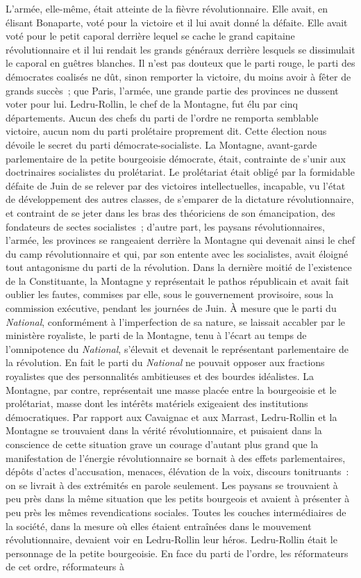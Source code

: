 \documentclass[twoside]{book} %
\begin{document}
L’armée, elle-même, était atteinte de la fièvre révolutionnaire. Elle avait, en élisant Bonaparte, voté pour la victoire et il lui avait donné la défaite. Elle avait voté pour le petit caporal derrière lequel se cache le grand capitaine révolutionnaire et il lui rendait les grands généraux derrière lesquels se dissimulait le caporal en guêtres blanches. Il n’est pas douteux que le parti rouge, le parti des démocrates coalisés ne dût, sinon remporter la victoire, du moins avoir à fêter de grands succès ; que Paris, l’armée, une grande partie des provinces ne dussent voter pour lui. Ledru-Rollin, le chef de la Montagne, fut élu par cinq départements. Aucun des chefs du parti de l’ordre ne remporta semblable victoire, aucun nom du parti prolétaire proprement dit. Cette élection nous dévoile le secret du parti démocrate-socialiste. La Montagne, avant-garde parlementaire de la petite bourgeoisie démocrate, était, contrainte de s’unir aux doctrinaires socialistes du prolétariat. Le prolétariat était obligé par la formidable défaite de Juin de se relever par des victoires intellectuelles, incapable, vu l’état de développement des autres classes, de s’emparer de la dictature révolutionnaire, et contraint de se jeter dans les bras des théoriciens de son émancipation, des fondateurs de sectes socialistes ; d’autre part, les paysans révolutionnaires, l’armée, les provinces se rangeaient derrière la Montagne qui devenait ainsi le chef du camp révolutionnaire et qui, par son entente avec les socialistes, avait éloigné tout antagonisme du parti de la révolution. Dans la dernière moitié de l’existence de la Constituante, la Montagne y représentait le pathos républicain et avait fait oublier les fautes, commises par elle, sous le gouvernement provisoire, sous la commission exécutive, pendant les journées de Juin. À mesure que le parti du \emph{National}, conformément à l’imperfection de sa nature, se laissait accabler par le ministère royaliste, le parti de la Montagne, tenu à l’écart au temps de l’omnipotence du \emph{National}, s’élevait et devenait le représentant parlementaire de la révolution. En fait le parti du \emph{National} ne pouvait opposer aux fractions royalistes que des personnalités ambitieuses et des bourdes idéalistes. La Montagne, par contre, représentait une masse placée entre la bourgeoisie et le prolétariat, masse dont les intérêts matériels exigeaient des institutions démocratiques. Par rapport aux Cavaignac et aux Marrast, Ledru-Rollin et la Montagne se trouvaient dans la vérité révolutionnaire, et puisaient dans la conscience de cette situation grave un courage d’autant plus grand que la manifestation de l’énergie révolutionnaire se bornait à des effets parlementaires, dépôts d’actes d’accusation, menaces, élévation de la voix, discours tonitruants : on se livrait à des extrémités en parole seulement. Les paysans se trouvaient à peu près dans la même situation que les petits bourgeois et avaient à présenter à peu près les mêmes revendications sociales. Toutes les couches intermédiaires de la société, dans la mesure où elles étaient entraînées dans le mouvement révolutionnaire, devaient voir en Ledru-Rollin leur héros. Ledru-Rollin était le personnage de la petite bourgeoisie. En face du parti de l’ordre, les réformateurs de cet ordre, réformateurs à 
\end{document}
